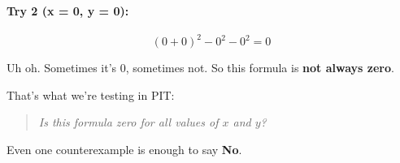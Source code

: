 \paragraph{Try 2 (x = 0, y = 0):}
\[
(0 + 0)^2 - 0^2 - 0^2 = 0
\]

\medskip
Uh oh. Sometimes it’s $0$, sometimes not. So this formula is \textbf{not always zero}.

\bigskip
That’s what we’re testing in PIT:

\begin{quote}
\emph{Is this formula zero for all values of $x$ and $y$?}
\end{quote}

Even one counterexample is enough to say \textbf{No}.